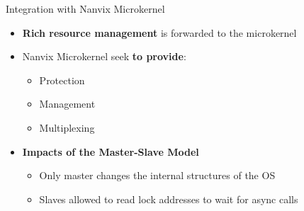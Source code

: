 		\begin{frame}[fragile]{Integration with Nanvix Microkernel}
			\begin{itemize}
				\item \textbf{Rich resource management} is forwarded to the microkernel
			\end{itemize}

			\begin{itemize}
				\item Nanvix Microkernel seek \textbf{to provide}:
				\begin{itemize}
					\item Protection
					\item Management
					\item Multiplexing
				\end{itemize}
			\end{itemize}

			\begin{itemize}
				\item \textbf{Impacts of the Master-Slave Model}
				\begin{itemize}
					\item Only master changes the internal structures of the OS
					\item Slaves allowed to read lock addresses to wait for async calls
				\end{itemize}
			\end{itemize}

		\end{frame}

			


